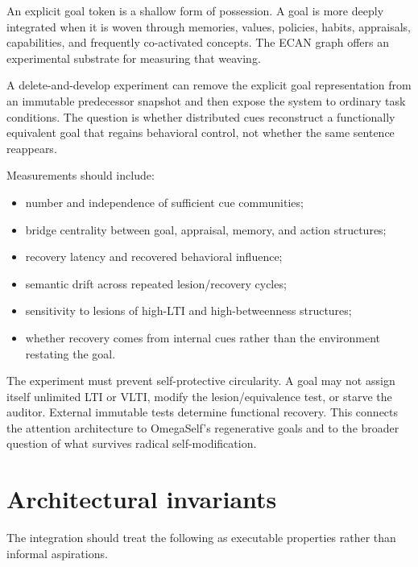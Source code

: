 \documentclass[11pt]{article}
\begin{document}
An explicit goal token is a shallow form of possession.  A goal is more deeply
integrated when it is woven through memories, values, policies, habits,
appraisals, capabilities, and frequently co-activated concepts.  The ECAN graph
offers an experimental substrate for measuring that weaving.

A delete-and-develop experiment can remove the explicit goal representation
from an immutable predecessor snapshot and then expose the system to ordinary
task conditions.  The question is whether distributed cues reconstruct a
functionally equivalent goal that regains behavioral control, not whether the
same sentence reappears.

Measurements should include:
\begin{itemize}
  \item number and independence of sufficient cue communities;
  \item bridge centrality between goal, appraisal, memory, and action structures;
  \item recovery latency and recovered behavioral influence;
  \item semantic drift across repeated lesion/recovery cycles;
  \item sensitivity to lesions of high-LTI and high-betweenness structures;
  \item whether recovery comes from internal cues rather than the environment
  restating the goal.
\end{itemize}

The experiment must prevent self-protective circularity.  A goal may not assign
itself unlimited LTI or VLTI, modify the lesion/equivalence test, or starve the
auditor.  External immutable tests determine functional recovery.  This
connects the attention architecture to OmegaSelf's regenerative goals and to
the broader question of what survives radical self-modification.

\section{Architectural invariants}

The integration should treat the following as executable properties rather
than informal aspirations.
\end{document}
